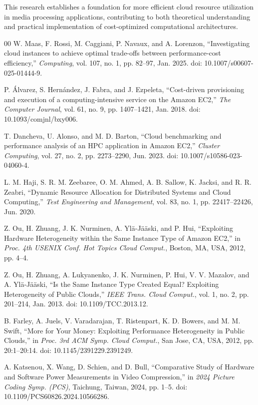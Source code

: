 \documentclass[conference]{IEEEtran}
\begin{document}
	This research establishes a foundation for more efficient cloud resource utilization in media processing applications, contributing to both theoretical understanding and practical implementation of cost-optimized computational architectures.
	
	
	\begin{thebibliography}{00}
		 W. Maas, F. Rossi, M. Caggiani, P. Navaux, and A. Lorenzon, ``Investigating cloud instances to achieve optimal trade-offs between performance-cost efficiency,'' \emph{Computing}, vol. 107, no. 1, pp. 82--97, Jan. 2025. doi: 10.1007/s00607-025-01444-9.
		
		 P. Álvarez, S. Hernández, J. Fabra, and J. Ezpeleta, ``Cost-driven provisioning and execution of a computing-intensive service on the Amazon EC2,'' \emph{The Computer Journal}, vol. 61, no. 9, pp. 1407--1421, Jan. 2018. doi: 10.1093/comjnl/bxy006.
		
		 T. Dancheva, U. Alonso, and M. D. Barton, ``Cloud benchmarking and performance analysis of an HPC application in Amazon EC2,'' \emph{Cluster Computing}, vol. 27, no. 2, pp. 2273--2290, Jun. 2023. doi: 10.1007/s10586-023-04060-4.
		
		 L. M. Haji, S. R. M. Zeebaree, O. M. Ahmed, A. B. Sallow, K. Jacksi, and R. R. Zeabri, ``Dynamic Resource Allocation for Distributed Systems and Cloud Computing,'' \emph{Test Engineering and Management}, vol. 83, no. 1, pp. 22417--22426, Jun. 2020.
		
		 Z. Ou, H. Zhuang, J. K. Nurminen, A. Ylä-Jääski, and P. Hui, ``Exploiting Hardware Heterogeneity within the Same Instance Type of Amazon EC2,'' in \emph{Proc. 4th USENIX Conf. Hot Topics Cloud Comput.}, Boston, MA, USA, 2012, pp. 4--4.
		
		 Z. Ou, H. Zhuang, A. Lukyanenko, J. K. Nurminen, P. Hui, V. V. Mazalov, and A. Ylä-Jääski, ``Is the Same Instance Type Created Equal? Exploiting Heterogeneity of Public Clouds,'' \emph{IEEE Trans. Cloud Comput.}, vol. 1, no. 2, pp. 201--214, Jan. 2013. doi: 10.1109/TCC.2013.12.
		
		 B. Farley, A. Juels, V. Varadarajan, T. Ristenpart, K. D. Bowers, and M. M. Swift, ``More for Your Money: Exploiting Performance Heterogeneity in Public Clouds,'' in \emph{Proc. 3rd ACM Symp. Cloud Comput.}, San Jose, CA, USA, 2012, pp. 20:1--20:14. doi: 10.1145/2391229.2391249.
		
		 A. Katsenou, X. Wang, D. Schien, and D. Bull, ``Comparative Study of Hardware and Software Power Measurements in Video Compression,'' in \emph{2024 Picture Coding Symp. (PCS)}, Taichung, Taiwan, 2024, pp. 1--5. doi: 10.1109/PCS60826.2024.10566286.
		

\end{thebibliography}
\end{document}
